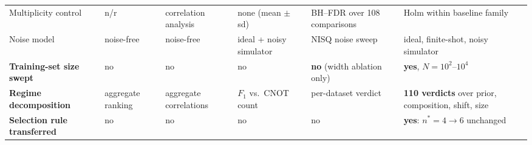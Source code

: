\begin{table}[t]
\begin{tabular}{@{}l p{2.05cm} p{2.05cm} p{2.05cm} p{2.35cm} p{2.6cm}@{}}
Multiplicity control & n/r           & correlation analysis & none (mean $\pm$ sd) & BH--FDR over 108 comparisons & Holm within baseline family \\
Noise model     & noise-free         & noise-free         & ideal + noisy simulator & NISQ noise sweep & ideal, finite-shot, noisy simulator \\
\midrule
\textbf{Training-set size swept} & no & no                & no                 & \textbf{no} (width ablation only) & \textbf{yes}, $N{=}10^2$--$10^4$ \\
\textbf{Regime decomposition} & aggregate ranking & aggregate correlations & $F_1$ vs.\ CNOT count & per-dataset verdict & \textbf{110 verdicts} over prior, composition, shift, size \\
\textbf{Selection rule transferred} & no & no & no            & no                 & \textbf{yes}: $n^\ast{=}4\!\to\!6$ unchanged \\
\bottomrule
\end{tabular}
\end{table}
